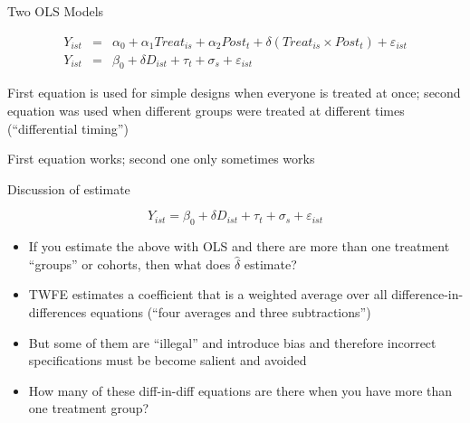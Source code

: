 \documentclass{beamer}
\begin{document}
\begin{frame}{Two OLS Models}

\begin{eqnarray}
Y_{ist} &=& \alpha_0 + \alpha_1 Treat_{is} + \alpha_2 Post_{t} + \delta (Treat_{is} \times Post_t) + \varepsilon_{ist} \\
Y_{ist} &=& \beta_0 + \delta D_{ist} + \tau_t + \sigma_s + \varepsilon_{ist}
\end{eqnarray}

\bigskip

First equation is used for simple designs when everyone is treated at once; second equation was used when different groups were treated at different times (``differential timing'')

\bigskip

First equation works; second one only sometimes works

\end{frame}



\begin{frame}{Discussion of estimate}


$$Y_{ist} = \beta_0 + \delta D_{ist} + \tau_t + \sigma_s + \varepsilon_{ist}$$


\begin{itemize}
\item If you estimate the above with OLS and there are more than one treatment ``groups'' or cohorts, then what does $\widehat{\delta}$ estimate?
\item TWFE estimates a coefficient that is a weighted average over all difference-in-differences equations (``four averages and three subtractions'') 
\item But some of them are ``illegal'' and introduce bias and therefore incorrect specifications must be become salient and avoided 
\item How many of these diff-in-diff equations are there when you have more than one treatment group? 

\end{itemize}

\end{frame}
\end{document}
